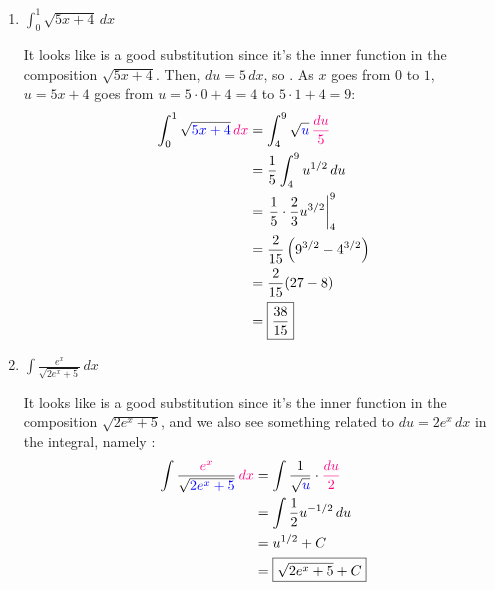\documentclass[main]{subfiles}
\begin{document}
\begin{enumerate}
\begin{enumerate}
  \item
    \begin{problem}[\vfill]
      $\displaystyle \int_0^1 \sqrt{5x + 4}\,dx$
    \end{problem}

    \begin{solution}
      It looks like  is a good substitution since it's
      the inner function in the composition $\sqrt{5x + 4}$.  Then, $du =
      5\,dx$, so .  As $x$ goes from $0$ to $1$,
      $u = 5x + 4$ goes from $u = 5 \cdot 0 + 4 = 4$ to $5 \cdot 1 + 4 =
      9$:
      \begin{align*}
        \int_0^1 \sqrt{\sub{5x + 4}}\,\subd{dx} &= \int_4^9
        \sqrt{\sub{u}}\,\subd{\frac{du}{5}} \\
        &= \frac{1}{5} \int_4^9 u^{1/2}\,du \\
        &= \left. \frac{1}{5} \cdot \frac{2}{3} u^{3/2} \right|_4^9 \\
        &= \frac{2}{15} \left( 9^{3/2} - 4^{3/2} \right) \\
        &= \frac{2}{15} (27 - 8) \\
        &= \boxed{\frac{38}{15}}
      \end{align*}
    \end{solution}

  \item
    \begin{problem}[\vfill]
      $\displaystyle \int \frac{e^x}{\sqrt{2e^x + 5}}\,dx$
    \end{problem}

    \begin{solution} %
      It looks like  is a good substitution since it's
      the inner function in the composition $\sqrt{2e^x + 5}$, and we also
      see something related to $du = 2 e^x\,dx$ in the integral, namely
      : 
      \begin{align*}
        \int \frac{\subd{e^x}}{\sqrt{\sub{2e^x + 5}}}\,\subd{dx} & =
        \int \frac{1}{\sqrt{\sub{u}}} \cdot \subd{\frac{du}{2}} \\
        & = \int \frac{1}{2} u^{-1/2}\,du \\
        & =  u^{1/2} + C \\
        & = \boxed{\sqrt{2e^x + 5} + C}
      \end{align*}
    \end{solution}


\end{enumerate}
\end{enumerate}
\end{document}
